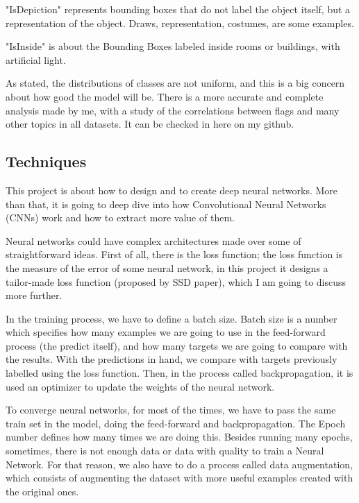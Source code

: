 \documentclass[11pt, a4paper, twocolumn]{article}
\begin{document}
"IsDepiction" represents bounding boxes that do not label the object itself, but a representation of the object. Draws, representation, costumes, are some examples.

"IsInside" is about the Bounding Boxes labeled inside rooms or buildings, with artificial light.

As stated, the distributions of classes are not uniform, and this is a big concern about how good the model will be. There is a more accurate and complete analysis made by me, with a study of the correlations between flags and many other topics in all datasets. It can be checked in here \cite{eda} on my github.

\subsection{Techniques}

This project is about how to design and to create deep neural networks. More than that, it is going to deep dive into how Convolutional Neural Networks (CNNs) work and how to extract more value of them.

Neural networks could have complex architectures made over some of straightforward ideas. First of all, there is the loss function; the loss function is the measure of the error of some neural network, in this project it designs a tailor-made loss function (proposed by SSD paper), which I am going to discuss more further.

In the training process, we have to define a batch size. Batch size is a number which specifies how many examples we are going to use in the feed-forward process (the predict itself), and how many targets we are going to compare with the results. With the predictions in hand, we compare with targets previously labelled using the loss function. Then, in the process called backpropagation, it is used an optimizer to update the weights of the neural network.

To converge neural networks, for most of the times, we have to pass the same train set in the model, doing the feed-forward and backpropagation. The Epoch number defines how many times we are doing this. Besides running many epochs, sometimes, there is not enough data or data with quality to train a Neural Network. For that reason, we also have to do a process called data augmentation, which consists of augmenting the dataset with more useful examples created with the original ones.
\end{document}
